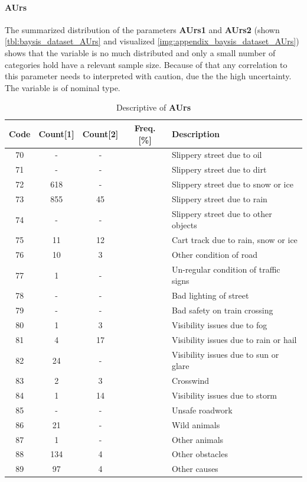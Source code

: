 \paragraph{AUrs}
\label{baysis_dataset_AUrs}
The summarized distribution of the parameters \textbf{AUrs1} and \textbf{AUrs2} (shown \autoref{tbl:baysis_dataset_AUrs} and visualized \autoref{img:appendix_baysis_dataset_AUrs}) shows that the variable is no much distributed and only a small number of categories hold have a relevant sample size. Because of that any correlation to this parameter needs to interpreted with caution, due the the high uncertainty. The variable is of nominal type.
\begin{table}[ht]
	\centering
	\small
	\begin{tabular}{c|c|c|c|l}
		\toprule
		Code & Count[1] & Count[2] & Freq. [\%] & Description \\ 
		\midrule
		70 & - 		& -		& & Slippery street due to oil \\
		71 & -		& -		& & Slippery street due to dirt \\
		72 & 618	& -		& & Slippery street due to snow or ice \\
		73 & 855	& 45	& & Slippery street due to rain \\
		74 & -		& -		& & Slippery street due to other objects \\
		75 & 11		& 12	& & Cart track due to rain, snow or ice \\
		76 & 10		& 3		& & Other condition of road \\
		77 & 1		& -		& & Un-regular condition of traffic signs \\
		78 & -		& -		& & Bad lighting of street \\
		79 & -		& -		& & Bad safety on train crossing \\
		80 & 1		& 3		& & Visibility issues due to fog \\
		81 & 4		& 17 	& & Visibility issues due to rain or hail \\
		82 & 24		& -		& & Visibility issues due to sun or glare \\
		83 & 2		& 3		& & Crosswind \\
		84 & 1		& 14	& & Visibility issues due to storm \\
		85 & -		& -		& & Unsafe roadwork \\
		86 & 21		& -		& & Wild animals \\
		87 & 1		& -		& & Other animals \\
		88 & 134	& 4		& & Other obstacles \\
		89 & 97		& 4		& & Other causes \\
		\bottomrule
	\end{tabular}
	\caption{Descriptive of \textbf{AUrs}}
	\label{tbl:baysis_dataset_AUrs}
	\vspace{-8mm}
\end{table}

